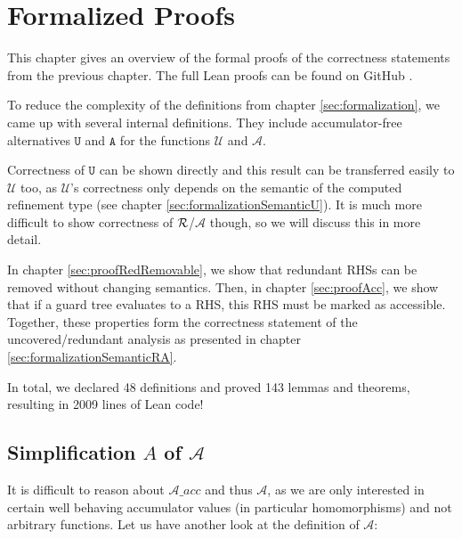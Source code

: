 \chapter{Formalized Proofs}\label{sec:proof}

This chapter gives an overview of the formal proofs of the correctness statements from the previous chapter.
The full Lean proofs can be found on GitHub \cite{leanProof}.


To reduce the complexity of the definitions from chapter \ref{sec:formalization}, we came up with several internal definitions.
They include accumulator-free alternatives $\mathtt{U}$ and $\mathtt{A}$ for the functions $\mathcal{U}$ and $\mathcal{A}$.


Correctness of $\mathtt{U}$ can be shown directly and this result can be transferred easily to $\mathcal{U}$ too, as $\mathcal{U}$'s correctness only depends on the semantic of the computed refinement type (see chapter \ref{sec:formalizationSemanticU}).
It is much more difficult to show correctness of $\mathcal{R}$/$\mathcal{A}$ though, so we will discuss this in more detail.

In chapter \ref{sec:proofRedRemovable}, we show that redundant RHSs can be removed without changing semantics.
Then, in chapter \ref{sec:proofAcc}, we show that if a guard tree evaluates to a RHS, this RHS must be marked as accessible. Together, these properties form the correctness statement of the uncovered/redundant analysis as presented in chapter \ref{sec:formalizationSemanticRA}.

In total, we declared 48 definitions and proved 143 lemmas and theorems, resulting in 2009 lines of Lean code!

\section{Simplification $A$ of $\mathcal{A}$}\label{chap:A_A}

It is difficult to reason about $\mathcal{A}\_acc$ and thus $\mathcal{A}$,
as we are only interested in certain well behaving accumulator values (in particular homomorphisms) and not arbitrary functions.
Let us have another look at the definition of $\mathcal{A}$:

